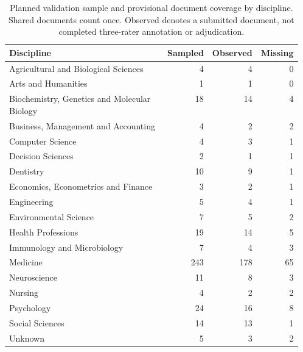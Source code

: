 \begin{table}[t]
\centering
\caption{Planned validation sample and provisional document coverage by discipline. Shared documents count once. Observed denotes a submitted document, not completed three-rater annotation or adjudication.}
\begin{tabular}{p{0.56\linewidth}rrr}
\toprule
Discipline & Sampled & Observed & Missing \\
\midrule
Agricultural and Biological Sciences & 4 & 4 & 0 \\
Arts and Humanities & 1 & 1 & 0 \\
Biochemistry, Genetics and Molecular Biology & 18 & 14 & 4 \\
Business, Management and Accounting & 4 & 2 & 2 \\
Computer Science & 4 & 3 & 1 \\
Decision Sciences & 2 & 1 & 1 \\
Dentistry & 10 & 9 & 1 \\
Economics, Econometrics and Finance & 3 & 2 & 1 \\
Engineering & 5 & 4 & 1 \\
Environmental Science & 7 & 5 & 2 \\
Health Professions & 19 & 14 & 5 \\
Immunology and Microbiology & 7 & 4 & 3 \\
Medicine & 243 & 178 & 65 \\
Neuroscience & 11 & 8 & 3 \\
Nursing & 4 & 2 & 2 \\
Psychology & 24 & 16 & 8 \\
Social Sciences & 14 & 13 & 1 \\
Unknown & 5 & 3 & 2 \\
\bottomrule
\end{tabular}
\label{tab:validation-sample}
\end{table}
